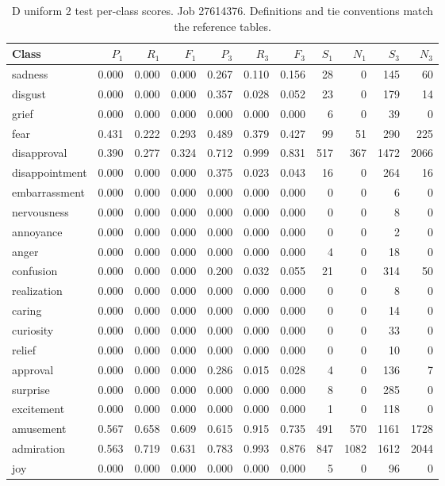 \begin{table}[!htbp]
\centering
\scriptsize
\setlength{\tabcolsep}{5pt}
\begin{tabular}{lrrrrrrrrrr}
\toprule
Class & $P_1$ & $R_1$ & $F_1$ & $P_3$ & $R_3$ & $F_3$ & $S_1$ & $N_1$ & $S_3$ & $N_3$ \\
\midrule
sadness & 0.000 & 0.000 & 0.000 & 0.267 & 0.110 & 0.156 & 28 & 0 & 145 & 60 \\
disgust & 0.000 & 0.000 & 0.000 & 0.357 & 0.028 & 0.052 & 23 & 0 & 179 & 14 \\
grief & 0.000 & 0.000 & 0.000 & 0.000 & 0.000 & 0.000 & 6 & 0 & 39 & 0 \\
fear & 0.431 & 0.222 & 0.293 & 0.489 & 0.379 & 0.427 & 99 & 51 & 290 & 225 \\
disapproval & 0.390 & 0.277 & 0.324 & 0.712 & 0.999 & 0.831 & 517 & 367 & 1472 & 2066 \\
disappointment & 0.000 & 0.000 & 0.000 & 0.375 & 0.023 & 0.043 & 16 & 0 & 264 & 16 \\
embarrassment & 0.000 & 0.000 & 0.000 & 0.000 & 0.000 & 0.000 & 0 & 0 & 6 & 0 \\
nervousness & 0.000 & 0.000 & 0.000 & 0.000 & 0.000 & 0.000 & 0 & 0 & 8 & 0 \\
annoyance & 0.000 & 0.000 & 0.000 & 0.000 & 0.000 & 0.000 & 0 & 0 & 2 & 0 \\
anger & 0.000 & 0.000 & 0.000 & 0.000 & 0.000 & 0.000 & 4 & 0 & 18 & 0 \\
confusion & 0.000 & 0.000 & 0.000 & 0.200 & 0.032 & 0.055 & 21 & 0 & 314 & 50 \\
realization & 0.000 & 0.000 & 0.000 & 0.000 & 0.000 & 0.000 & 0 & 0 & 8 & 0 \\
caring & 0.000 & 0.000 & 0.000 & 0.000 & 0.000 & 0.000 & 0 & 0 & 14 & 0 \\
curiosity & 0.000 & 0.000 & 0.000 & 0.000 & 0.000 & 0.000 & 0 & 0 & 33 & 0 \\
relief & 0.000 & 0.000 & 0.000 & 0.000 & 0.000 & 0.000 & 0 & 0 & 10 & 0 \\
approval & 0.000 & 0.000 & 0.000 & 0.286 & 0.015 & 0.028 & 4 & 0 & 136 & 7 \\
surprise & 0.000 & 0.000 & 0.000 & 0.000 & 0.000 & 0.000 & 8 & 0 & 285 & 0 \\
excitement & 0.000 & 0.000 & 0.000 & 0.000 & 0.000 & 0.000 & 1 & 0 & 118 & 0 \\
amusement & 0.567 & 0.658 & 0.609 & 0.615 & 0.915 & 0.735 & 491 & 570 & 1161 & 1728 \\
admiration & 0.563 & 0.719 & 0.631 & 0.783 & 0.993 & 0.876 & 847 & 1082 & 1612 & 2044 \\
joy & 0.000 & 0.000 & 0.000 & 0.000 & 0.000 & 0.000 & 5 & 0 & 96 & 0 \\
\bottomrule
\end{tabular}
\caption{D uniform 2 test per-class scores. Job 27614376. Definitions and tie conventions match the reference tables.}
\label{tab:classes-d_uniform_k2}
\end{table}
